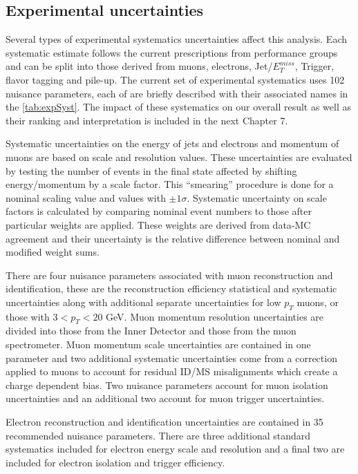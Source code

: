 \subsection{Experimental uncertainties}
Several types of experimental systematics uncertainties affect this analysis. Each systematic estimate follows the current prescriptions from performance groups and can be split into those derived from muons, electrons, Jet/$E_T^{miss}$, Trigger, flavor tagging and pile-up. The current set of experimental systematics uses 102 nuisance parameters, each of are briefly described with their associated names in the \ref{tab:expSyst}. The impact of these systematics on our overall result as well as their ranking and interpretation is included in the next Chapter 7. 
 
Systematic uncertainties on the energy of jets and electrons and momentum of muons are based on scale and resolution values. These uncertainties are evaluated by testing the number of events in the final state affected by shifting energy/momentum by a scale factor. This ``smearing'' procedure is done for a nominal scaling value and values with $\pm 1 \sigma$. Systematic uncertainty on scale factors is calculated by comparing nominal event numbers to those after particular weights are applied. These weights are derived from data-MC agreement and their uncertainty is the relative difference between nominal and modified weight sums.  
 
There are four nuisance parameters associated with muon reconstruction and identification, these are the reconstruction efficiency statistical and systematic uncertainties along with additional separate uncertainties for low $p_T$ muons, or those with $3 < p_T <20$ GeV. Muon momentum resolution uncertainties are divided into those from the Inner Detector and those from the muon spectrometer. Muon momentum scale uncertainties are contained in one parameter and two additional systematic uncertainties come from a correction applied to muons to account for residual ID/MS misalignments which create a charge dependent bias. Two nuisance parameters account for muon isolation uncertainties and an additional two account for muon trigger uncertainties.  

Electron reconstruction and identification uncertainties are contained in 35 recommended nuisance parameters. There are three additional standard systematics included for electron energy scale and resolution and a final two are included for electron isolation and trigger efficiency.

